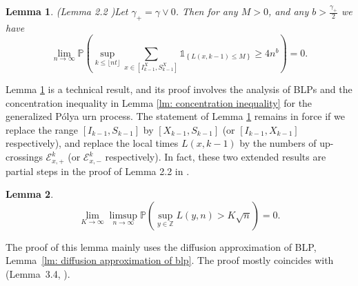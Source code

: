 \documentclass[twoside,12pt, a4paper, final]{article}
\newtheorem{lemma}{Lemma}[section]
\numberwithin{equation}{section}
\theoremstyle{remark}
\newcommand{\comment}[1]{\textcolor{blue}{(Comment: #1)}}
\begin{document}
	\begin{lemma}(Lemma 2.2 \cite{KMP23})\label{lm: number of rarely visit sites}
		Let $\gamma_+ = \gamma \vee 0$. Then for any $M>0$, and any $b>\frac{\gamma_+}{2}$ we have
		$$
		\lim_{n\to\infty} \mathbb{P}\left(\sup_{k\leq\lfloor nt \rfloor}  \sum_{x\in [I^X_{k-1}, S^X_{k-1}]} \mathbb{1}_{\left\{ L(x,k-1) \leq M \right\}} \geq 4n^b \right) = 0.
		$$
		
	\end{lemma}	
	Lemma \ref{lm: number of rarely visit sites} is a technical result, and its proof involves the analysis of BLPs and the concentration inequality in Lemma \ref{lm: concentration inequality} for the generalized P\'{o}lya urn process. The statement of Lemma \ref{lm: number of rarely visit sites} remains in force if we replace the range $[I_{k-1}, S_{k-1}]$ by $[X_{k - 1},S_{k - 1}]$ (or $[I_{k-1},X_{k - 1}]$ respectively), and replace the local times $L(x,k-1)$ by the numbers of up-crossings $\mathcal{E}^{k}_{x,+}$ (or $\mathcal{E}^{k}_{x,-}$ respectively). In fact, these two extended results are partial steps in the proof of Lemma 2.2 in \cite{KMP23}.   
	
	\begin{lemma}
		\label{lm: uniform control of local time}
		\[
		\lim_{K \to  \infty } \limsup_{n \to \infty } \mathbb{P}\left( \sup_{y \in \mathbb{Z}} L\left( y, n \right) > K \sqrt{n}  \right) = 0
		.\] 
	\end{lemma}
	The proof of this lemma mainly uses the diffusion approximation of BLP, Lemma~\ref{lm: diffusion approximation of blp}. The proof mostly coincides with (Lemma~3.4, \cite{KP16}). 
	
\end{document}
